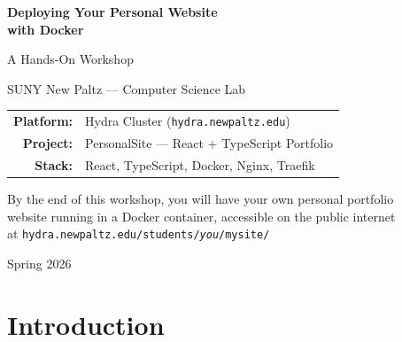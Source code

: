 \documentclass[11pt, letterpaper]{article}
\begin{document}
\begin{titlepage}
\centering
\vspace*{2cm}

{\Huge\bfseries Deploying Your Personal Website\\[0.3em] with Docker\par}

\vspace{1.5cm}

{\LARGE A Hands-On Workshop\par}

\vspace{1cm}

{\Large SUNY New Paltz --- Computer Science Lab\par}

\vspace{2cm}

{\large
\begin{tabular}{rl}
\textbf{Platform:} & Hydra Cluster (\texttt{hydra.newpaltz.edu}) \\
\textbf{Project:}  & PersonalSite --- React + TypeScript Portfolio \\
\textbf{Stack:}    & React, TypeScript, Docker, Nginx, Traefik \\
\end{tabular}
\par}

\vspace{2cm}

\begin{tcolorbox}[
  colback=hydraBlue!8,
  colframe=hydraBlue!60,
  width=0.85\textwidth,
  arc=4pt,
  boxrule=1pt,
]
\centering\large
By the end of this workshop, you will have your own personal portfolio\\
website running in a Docker container, accessible on the public internet\\
at \texttt{hydra.newpaltz.edu/students/\textit{you}/mysite/}
\end{tcolorbox}

\vfill
{\small Spring 2026}
\end{titlepage}

\tableofcontents
\newpage

\section{Introduction}
\end{document}

